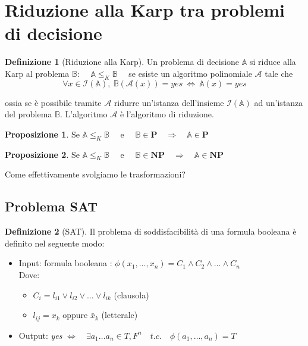 \documentclass[a4paper]{article}
\theoremstyle{definition}
\newtheorem{definit}{Definizione}[subsection]
\newtheorem{prop}{Proposizione}[subsection]
\newcommand{\p}{\mathbf{P}}
\newcommand{\np}{\mathbf{NP}}
\newcommand{\prob}[1]{\mathbb{#1}}
\newcommand{\instance}[1]{\mathcal{I}(\prob{#1})}
\newcommand{\alg}[1]{\mathcal{#1}}
\begin{document}
	\section{Riduzione alla Karp tra problemi di decisione}
		\begin{definit}[Riduzione alla Karp]
			Un problema di decisione $ \prob{A} $ si riduce alla Karp al problema $ \prob{B} $: $ \quad \prob{A} \leqslant_K \prob{B} \quad $ se esiste un algoritmo polinomiale $ \alg{A} $ tale che 
			\[
				\forall x \in \instance{A},\ \prob{B}(\alg{A}(x)) = yes \ \Leftrightarrow \ \prob{A}(x) = yes
			\]
		\end{definit}
	ossia se è possibile tramite $\alg{A}$ ridurre un'istanza dell'insieme $\instance{A}$ ad un'istanza del problema $\prob{B}$. L'algoritmo $\alg{A}$ è l'algoritmo di riduzione. \\
		
		\begin{prop}
			Se $ \prob{A} \leqslant_K \prob{B} \quad\text{ e }\quad \prob{B}\in \p \quad \Rightarrow\quad \prob{A}\in\p $
		\end{prop} 
		\begin{prop}
			Se $ \prob{A} \leqslant_K \prob{B} \quad\text{ e }\quad \prob{B}\in \np \quad \Rightarrow\quad \prob{A}\in\np $
		\end{prop} 
		
		Come effettivamente svolgiamo le trasformazioni?
		
		\subsection{Problema SAT}
			\begin{definit}[SAT]
				Il problema di soddisfacibilità di una formula booleana è definito nel seguente modo:
				\begin{itemize}
					\item Input: formula booleana : $ \phi (x_1, \dots, x_n) = C_1 \wedge C_2 \wedge \dots \wedge C_n $\\
					Dove: \begin{itemize}
						\item $ C_i = l_{i1} \vee l_{i2} \vee \dots \vee l_{ik} $ (clausola)
						\item $ l_{ij} = x_k \text{ oppure } \bar{x}_k $ (letterale)
					\end{itemize}
					\item Output: \textit{yes} $ \Leftrightarrow\quad\exists a_1\dots a_n \in {T,F}^n\quad t.c.\quad \phi(a_1,\dots, a_n) = T $ 
				\end{itemize}
			\end{definit}
			
\end{document}
